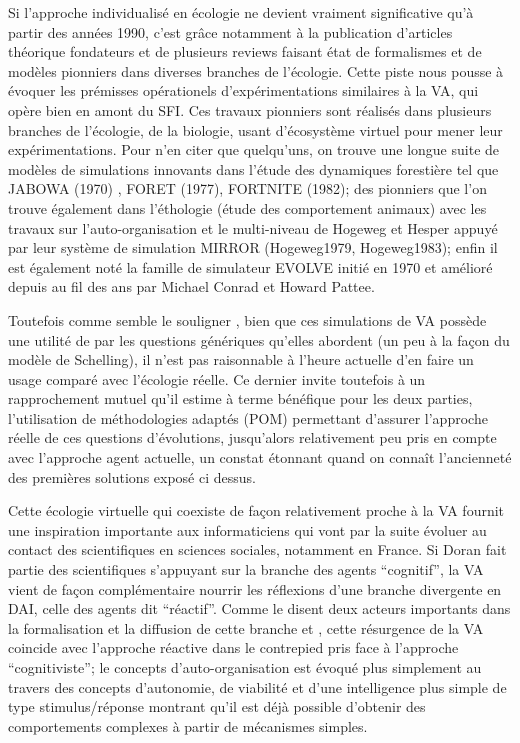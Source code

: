 Si l'approche individualisé en écologie ne devient vraiment significative qu'à partir des années 1990, c'est grâce notamment à la publication d'articles théorique fondateurs \autocite{Huston1988} et de plusieurs reviews faisant état de formalismes \autocite{Hogeweg1988} et de modèles pionniers \autocites{Hogeweg1990, DeAngelis1992, Judson1994} dans diverses branches de l'écologie. Cette piste nous pousse à évoquer les prémisses opérationels d'expérimentations similaires à la VA, qui opère bien en amont du SFI. Ces travaux pionniers sont réalisés dans plusieurs branches de l'écologie, de la biologie, usant d'écosystème virtuel pour mener leur expérimentations. Pour n'en citer que quelqu'uns, on trouve une longue suite de modèles de simulations innovants dans l'étude des dynamiques forestière \autocite{Bugmann2001} tel que JABOWA (1970) \autocite{Botkin1972}, FORET (1977), FORTNITE (1982); des pionniers que l'on trouve également dans l'éthologie (étude des comportement animaux) avec les travaux sur l'auto-organisation et le multi-niveau de Hogeweg et Hesper appuyé par leur système de simulation MIRROR (Hogeweg1979, Hogeweg1983); enfin il est également noté la famille de simulateur EVOLVE initié en 1970 et amélioré depuis au fil des ans par Michael Conrad et Howard Pattee. \autocites{Conrad1970, Pattee2002}


Toutefois comme semble le souligner \textcite{Dorin2008}, bien que ces simulations de VA possède une utilité de par les questions génériques qu'elles abordent (un peu à la façon du modèle de Schelling), il n'est pas raisonnable à l'heure actuelle d'en faire un usage comparé avec l'écologie réelle. Ce dernier invite toutefois à un rapprochement mutuel qu'il estime à terme bénéfique pour les deux parties, l'utilisation de méthodologies adaptés (POM) permettant d'assurer l'approche réelle de ces questions d'évolutions, jusqu'alors relativement peu pris en compte avec l'approche agent actuelle, un constat étonnant quand on connaît l'ancienneté des premières solutions exposé ci dessus.

Cette écologie virtuelle qui coexiste de façon relativement proche à la VA fournit une inspiration importante aux informaticiens qui vont par la suite évoluer au contact des scientifiques en sciences sociales, notamment en France. Si Doran fait partie des scientifiques s'appuyant sur la branche des agents \enquote{cognitif}, la VA vient de façon complémentaire nourrir les réflexions d'une branche divergente en DAI, celle des agents dit \enquote{réactif}. Comme le disent deux acteurs importants dans la formalisation et la diffusion de cette branche \autocite[31-32]{Ferber1995} et \textcite[7-10]{Drogoul1993}, cette résurgence de la VA coincide avec l'approche réactive dans le contrepied pris face à l'approche \enquote{cognitiviste}; le concepts d'auto-organisation est évoqué plus simplement au travers des concepts d'autonomie, de viabilité et d'une intelligence plus simple de type stimulus/réponse montrant qu'il est déjà possible d'obtenir des comportements complexes à partir de mécanismes simples.

